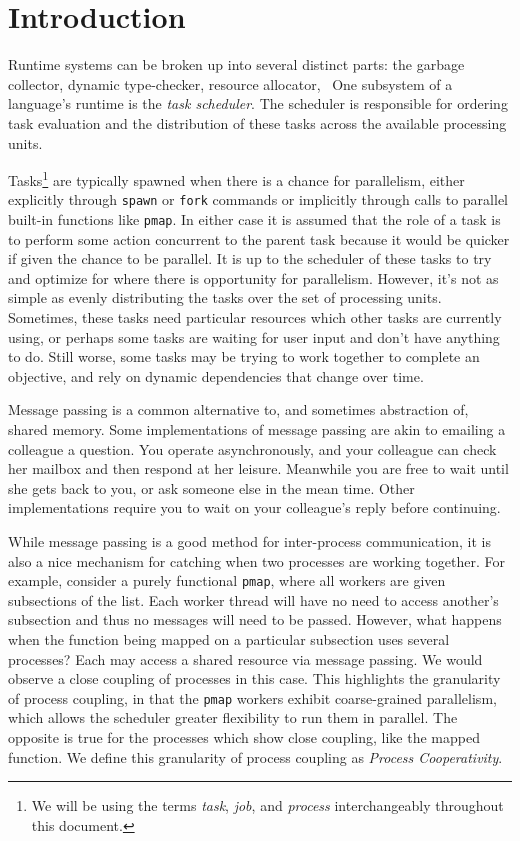 \chapter{Introduction}
%
\label{chap:introduction}

Runtime systems can be broken up into several distinct parts: the garbage 
collector, dynamic type-checker, resource allocator, \etc~One 
subsystem of a language's runtime is the {\em task scheduler}. The scheduler is 
responsible for ordering task evaluation and the distribution of 
these tasks across the available processing units.

Tasks\footnote{We will be using the terms {\em task}, {\em job}, and {\em process} interchangeably throughout this document.}
are typically spawned when there is a chance for parallelism, either 
explicitly through \texttt{spawn} or \texttt{fork} commands or implicitly 
through calls to parallel built-in functions like \texttt{pmap}. In either 
case it is assumed that the role of a task is to perform some action concurrent 
to the parent task because it would be quicker if given the chance to be 
parallel.
It is up to the scheduler of these tasks to try and optimize for where there
is opportunity for parallelism. However, it's not as simple as evenly 
distributing the tasks over the set of processing units. Sometimes, these 
tasks need particular resources which other tasks are currently using,
or perhaps some tasks are waiting for user input and don't have anything to
do. Still worse, some tasks may be trying to work together to complete an 
objective, and rely on dynamic dependencies that change over time.

Message passing is a common alternative to, and sometimes abstraction of, shared
memory. Some implementations of message passing are akin to emailing a colleague a question. You operate
asynchronously, and your colleague can check her mailbox and then
respond at her leisure. Meanwhile you are free to wait until she gets back to you, 
or ask someone else in the mean time.
Other implementations require you to wait on your colleague's reply before
continuing.

While message passing is a good method for inter-process communication, it is
also a nice mechanism for catching when two processes are working together.
For example, consider a purely functional \texttt{pmap}, where all 
workers are given subsections of the list. Each worker thread will have no
need to access another's subsection and thus no messages will need to be passed.
However, what happens when the function being mapped on a particular subsection uses 
several processes? Each may access a shared resource via message passing. 
We would observe a close coupling of processes in this case.
This highlights the granularity of process coupling, in that the \texttt{pmap}
workers exhibit coarse-grained parallelism, which allows the scheduler greater 
flexibility to run them in parallel. The opposite is true for the processes 
which show close coupling, like the mapped function. We define this granularity of process
coupling as {\em Process Cooperativity}.

